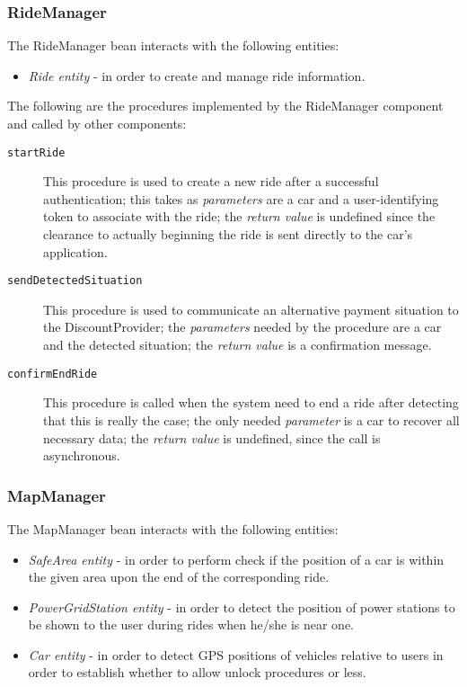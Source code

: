 \subsubsection{RideManager}
The RideManager bean interacts with the following entities:
\begin{itemize}
\item \textit{Ride entity} - in order to create and manage ride information.
\end{itemize}

The following are the procedures implemented by the RideManager component and called by other components:
\begin{description}
\item[\texttt{startRide}] This procedure is used to create a new ride after a successful authentication; this takes as \textit{parameters} are a car and a user-identifying token to associate with the ride; the \textit{return value} is undefined since the clearance to actually beginning the ride is sent directly to the car's application.
\item[\texttt{sendDetectedSituation}] This procedure is used to communicate an alternative payment situation to the DiscountProvider; the \textit{parameters} needed by the procedure are a car and the detected situation; the \textit{return value} is a confirmation message.
\item[\texttt{confirmEndRide}] This procedure is called when the system need to end a ride after detecting that this is really the case; the only needed \textit{parameter} is a car to recover all necessary data; the \textit{return value} is undefined, since the call is asynchronous.
\end{description}
\subsubsection{MapManager}
The MapManager bean interacts with the following entities:
\begin{itemize}
\item \textit{SafeArea entity} - in order to perform check if the position of a car is within the given area upon the end of the corresponding ride.
\item \textit{PowerGridStation entity} - in order to detect the position of power stations to be shown to the user during rides when he/she is near one.
\item \textit{Car entity} - in order to detect GPS positions of vehicles relative to users in order to establish whether to allow unlock procedures or less.
\end{itemize}

